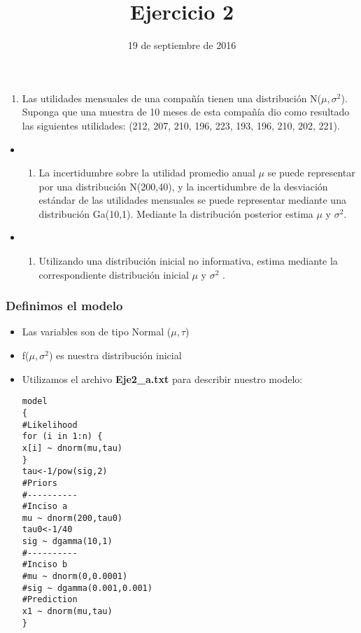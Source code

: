\documentclass[]{article}
\title{Ejercicio 2}
\author{}
\date{19 de septiembre de 2016}
\providecommand{\tightlist}{%
  \setlength{\itemsep}{0pt}\setlength{\parskip}{0pt}}
\begin{document}
\maketitle

\begin{enumerate}
\def\labelenumi{\arabic{enumi})}
\setcounter{enumi}{1}
\tightlist
\item
  Las utilidades mensuales de una compañía tienen una distribución
  N(\(\mu, \sigma^2\)). Suponga que una muestra de 10 meses de esta
  compañía dio como resultado las siguientes utilidades: (212, 207, 210,
  196, 223, 193, 196, 210, 202, 221).
\end{enumerate}

\begin{itemize}
\item
  \begin{enumerate}
  \def\labelenumi{\alph{enumi})}
  \tightlist
  \item
    La incertidumbre sobre la utilidad promedio anual \(\mu\) se puede
    representar por una distribución N(200,40), y la incertidumbre de la
    desviación estándar de las utilidades mensuales se puede representar
    mediante una distribución Ga(10,1). Mediante la distribución
    posterior estima \(\mu\) y \(\sigma^2\).
  \end{enumerate}
\item
  \begin{enumerate}
  \def\labelenumi{\alph{enumi})}
  \setcounter{enumi}{1}
  \tightlist
  \item
    Utilizando una distribución inicial no informativa, estima mediante
    la correspondiente distribución inicial \(\mu\) y \(\sigma^2\) .
  \end{enumerate}
\end{itemize}

\subsubsection{Definimos el modelo}\label{definimos-el-modelo}

\begin{itemize}
\item
  Las variables son de tipo Normal (\(\mu, \tau\))
\item
  f(\(\mu, \sigma^2\)) es nuestra distribución inicial
\item
  Utilizamos el archivo \textbf{Eje2\_a.txt} para describir nuestro
  modelo:

\begin{verbatim}
model
{
#Likelihood
for (i in 1:n) {
x[i] ~ dnorm(mu,tau)
}
tau<-1/pow(sig,2)
#Priors 
#----------
#Inciso a
mu ~ dnorm(200,tau0)
tau0<-1/40
sig ~ dgamma(10,1)
#----------
#Inciso b
#mu ~ dnorm(0,0.0001)
#sig ~ dgamma(0.001,0.001)
#Prediction
x1 ~ dnorm(mu,tau)
}
\end{verbatim}
\end{itemize}
\end{document}
